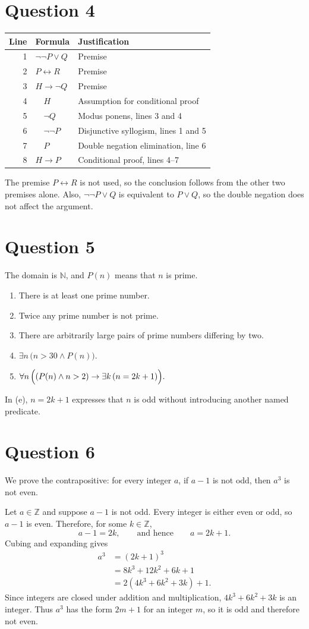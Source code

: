 \documentclass[11pt,a4paper]{article}
\newcommand{\question}[1]{\Needspace{6\baselineskip}\section*{Question #1}}
\begin{document}
\newpage
\question{4}
\begin{center}
\renewcommand{\arraystretch}{1.2}
\begin{tabular}{rll}
\toprule
Line & Formula & Justification\\
\midrule
1 & $\neg\neg P\vee Q$ & Premise\\
2 & $P\leftrightarrow R$ & Premise\\
3 & $H\to\neg Q$ & Premise\\
4 & $\quad H$ & Assumption for conditional proof\\
5 & $\quad\neg Q$ & Modus ponens, lines 3 and 4\\
6 & $\quad\neg\neg P$ & Disjunctive syllogism, lines 1 and 5\\
7 & $\quad P$ & Double negation elimination, line 6\\
8 & $H\to P$ & Conditional proof, lines 4--7\\
\bottomrule
\end{tabular}
\end{center}
The premise $P\leftrightarrow R$ is not used, so the conclusion follows from the other two premises alone. Also, $\neg\neg P\vee Q$ is equivalent to $P\vee Q$, so the double negation does not affect the argument.

\question{5}
The domain is $\mathbb N$, and $P(n)$ means that $n$ is prime.
\begin{enumerate}[label=(\alph*)]
\item There is at least one prime number.
\item Twice any prime number is not prime.
\item There are arbitrarily large pairs of prime numbers differing by two.
\item $\displaystyle \exists n\,\bigl(n>30\wedge P(n)\bigr).$
\item $\displaystyle \forall n\,\Bigl((P(n)\wedge n>2)\to\exists k\,(n=2k+1)\Bigr).$
\end{enumerate}
In (e), $n=2k+1$ expresses that $n$ is odd without introducing another named predicate.

\question{6}
We prove the contrapositive: for every integer $a$, if $a-1$ is not odd, then $a^3$ is not even.

Let $a\in\mathbb Z$ and suppose $a-1$ is not odd. Every integer is either even or odd, so $a-1$ is even. Therefore, for some $k\in\mathbb Z$,
\[
a-1=2k,\qquad\text{and hence}\qquad a=2k+1.
\]
Cubing and expanding gives
\begin{align*}
a^3&=(2k+1)^3\\
&=8k^3+12k^2+6k+1\\
&=2(4k^3+6k^2+3k)+1.
\end{align*}
Since integers are closed under addition and multiplication, $4k^3+6k^2+3k$ is an integer. Thus $a^3$ has the form $2m+1$ for an integer $m$, so it is odd and therefore not even.
\end{document}
